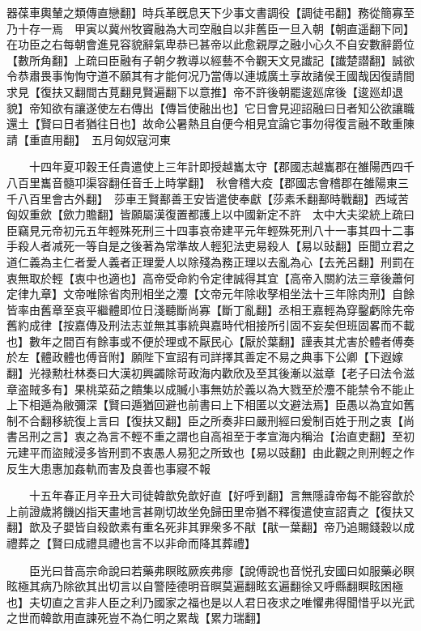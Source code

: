 器葆車輿輦之類傳直戀翻】時兵革旣息天下少事文書調役【調徒弔翻】務從簡寡至乃十存一焉　甲寅以冀州牧竇融為大司空融自以非舊臣一旦入朝【朝直遥翻下同】在功臣之右每朝會進見容貌辭氣卑恭已甚帝以此愈親厚之融小心久不自安數辭爵位【數所角翻】上疏曰臣融有子朝夕教導以經藝不令觀天文見䜟記【䜟楚譛翻】誠欲令恭肅畏事恂恂守道不願其有才能何况乃當傳以連城廣土享故諸侯王國哉因復請間求見【復扶又翻間古莧翻見賢遍翻下以意推】帝不許後朝罷逡廵席後【逡廵却退貌】帝知欲有讓遂使左右傳出【傳旨使融出也】它日會見迎詔融曰日者知公欲讓職還土【賢曰日者猶往日也】故命公暑熱且自便今相見宜論它事勿得復言融不敢重陳請【重直用翻】　五月匈奴寇河東

　　十四年夏卭穀王任貴遣使上三年計即授越巂太守【郡國志越巂郡在雒陽西四千八百里巂音髓卭渠容翻任音壬上時掌翻】　秋會稽大疫【郡國志會稽郡在雒陽東三千八百里會古外翻】　莎車王賢鄯善王安皆遣使奉獻【莎素禾翻鄯時戰翻】西域苦匈奴重歛【歛力贍翻】皆願屬漢復置都護上以中國新定不許　太中大夫梁統上疏曰臣竊見元帝初元五年輕殊死刑三十四事哀帝建平元年輕殊死刑八十一事其四十二事手殺人者减死一等自是之後著為常準故人輕犯法吏易殺人【易以䜴翻】臣聞立君之道仁義為主仁者愛人義者正理愛人以除殘為務正理以去亂為心【去羌呂翻】刑罰在衷無取於輕【衷中也適也】高帝受命約令定律誠得其宜【高帝入關約法三章後蕭何定律九章】文帝唯除省肉刑相坐之灋【文帝元年除收孥相坐法十三年除肉刑】自餘皆率由舊章至哀平繼體即位日淺聽斷尚寡【斷丁亂翻】丞相王嘉輕為穿鑿虧除先帝舊約成律【按嘉傳及刑法志並無其事統與嘉時代相接所引固不妄矣但班固畧而不載也】數年之間百有餘事或不便於理或不厭民心【厭於葉翻】謹表其尤害於體者傅奏於左【體政體也傅音附】願陛下宣詔有司詳擇其善定不易之典事下公卿【下遐嫁翻】光禄勲杜林奏曰大漢初興蠲除苛政海内歡欣及至其後漸以滋章【老子曰法令滋章盗賊多有】果桃菜茹之饋集以成贓小事無妨於義以為大戮至於灋不能禁令不能止上下相遁為敝彌深【賢曰遁猶回避也前書曰上下相匿以文避法焉】臣愚以為宜如舊制不合翻移統復上言曰【復扶又翻】臣之所奏非曰嚴刑經曰爰制百姓于刑之衷【尚書呂刑之言】衷之為言不輕不重之謂也自高祖至于孝宣海内稱治【治直吏翻】至初元建平而盜賊浸多皆刑罰不衷愚人易犯之所致也【易以豉翻】由此觀之則刑輕之作反生大患惠加姦軌而害及良善也事寢不報

　　十五年春正月辛丑大司徒韓歆免歆好直【好呼到翻】言無隱諱帝每不能容歆於上前證歲將饑凶指天畫地言甚剛切故坐免歸田里帝猶不釋復遣使宣詔責之【復扶又翻】歆及子嬰皆自殺歆素有重名死非其罪衆多不猒【猒一葉翻】帝乃追賜錢穀以成禮葬之【賢曰成禮具禮也言不以非命而降其葬禮】

　　臣光曰昔高宗命說曰若藥弗瞑眩厥疾弗瘳【說傅說也音悦孔安國曰如服藥必瞑眩極其病乃除欲其出切言以自警陸德明音瞑莫遍翻眩玄遍翻徐又呼縣翻瞑眩困極也】夫切直之言非人臣之利乃國家之福也是以人君日夜求之唯懼弗得聞惜乎以光武之世而韓歆用直諫死豈不為仁明之累哉【累力瑞翻】

